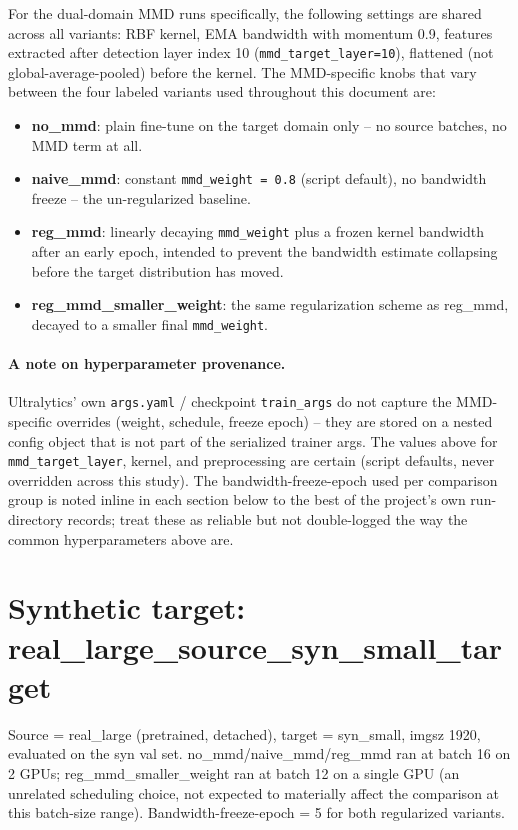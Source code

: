 \documentclass[11pt]{article}
\begin{document}
For the dual-domain MMD runs specifically, the following settings are shared across
all variants: RBF kernel, EMA bandwidth with momentum 0.9, features extracted after
detection layer index 10 (\texttt{mmd\_target\_layer=10}), flattened (not
global-average-pooled) before the kernel. The MMD-specific knobs that vary between
the four labeled variants used throughout this document are:
\begin{itemize}
    \item \textbf{no\_mmd}: plain fine-tune on the target domain only -- no source
    batches, no MMD term at all.
    \item \textbf{naive\_mmd}: constant \texttt{mmd\_weight = 0.8} (script default),
    no bandwidth freeze -- the un-regularized baseline.
    \item \textbf{reg\_mmd}: linearly decaying \texttt{mmd\_weight} plus a frozen
    kernel bandwidth after an early epoch, intended to prevent the bandwidth
    estimate collapsing before the target distribution has moved.
    \item \textbf{reg\_mmd\_smaller\_weight}: the same regularization scheme as
    reg\_mmd, decayed to a smaller final \texttt{mmd\_weight}.
\end{itemize}

\paragraph{A note on hyperparameter provenance.} Ultralytics' own \texttt{args.yaml}
/ checkpoint \texttt{train\_args} do not capture the MMD-specific overrides (weight,
schedule, freeze epoch) -- they are stored on a nested config object that is not part
of the serialized trainer args. The values above for \texttt{mmd\_target\_layer},
kernel, and preprocessing are certain (script defaults, never overridden across this
study). The bandwidth-freeze-epoch used per comparison group is noted inline in each
section below to the best of the project's own run-directory records; treat these as
reliable but not double-logged the way the common hyperparameters above are.

\section{Synthetic target: real\_large\_source\_syn\_small\_target}

Source = real\_large (pretrained, detached), target = syn\_small, imgsz 1920,
evaluated on the syn val set. no\_mmd/naive\_mmd/reg\_mmd ran at batch 16 on 2 GPUs;
reg\_mmd\_smaller\_weight ran at batch 12 on a single GPU (an unrelated scheduling
choice, not expected to materially affect the comparison at this batch-size range).
Bandwidth-freeze-epoch = 5 for both regularized variants.
\end{document}
